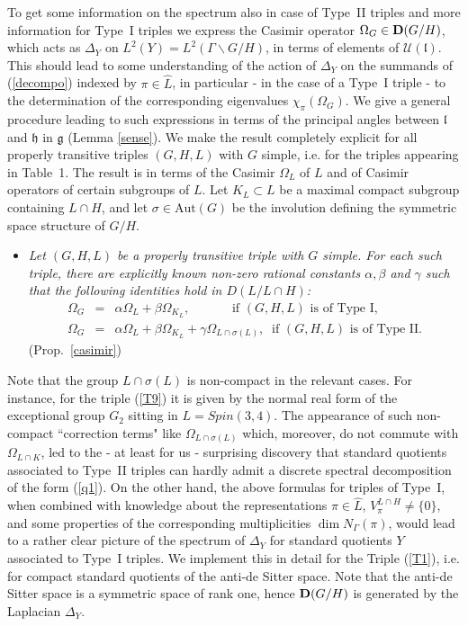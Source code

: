 \documentclass[10]{amsart}
\theoremstyle{remark}
\theoremstyle{definition}
\numberwithin{equation}{section}
\newcommand{\Aut}{{\mathrm{Aut}}}
\newcommand{\fg}{{\mathfrak g}}
\newcommand{\fh}{{\mathfrak h}}
\newcommand{\fl}{{\mathfrak l}}
\newcommand{\Cal}{\mathcal}
\begin{document}
To get some information on the spectrum also in case of Type~II triples and more information for Type~I triples
we express the Casimir operator $\Omega_G\in {\bf D}(G/H)$, which acts as $\Delta_Y$ on $L^2(Y)=L^2(\Gamma\backslash G/H)$, in terms of elements of ${\Cal U}(\fl)$.
This should lead to some understanding of the action of  $\Delta_Y$ on the summands of (\ref{decompo}) indexed by $\pi\in\widehat L$,
in particular - in the case of a Type~I triple - to the determination of the corresponding eigenvalues $\chi_\pi(\Omega_G)$. We give a general procedure leading to such expressions
in terms of the principal angles between $\fl$ and $\fh$ in $\fg$ (Lemma \ref{sense}). We make the result completely explicit for all properly transitive triples
$(G,H,L)$ with $G$ simple, i.e. for the triples appearing in Table~1. The result is in terms of the Casimir $\Omega_L$ of $L$ and of Casimir operators of certain subgroups of $L$. Let $K_L\subset L$ be a maximal compact subgroup containing $L\cap H$, and let $\sigma\in\Aut(G)$ be the involution defining the symmetric space structure of $G/H$.
\begin{itemize}
\item[({\bf E})] {\em Let $(G,H,L)$ be a properly transitive triple with $G$ simple. For each such triple, there are explicitly known non-zero rational constants $\alpha,\beta$ and 
$\gamma$ such
that the following identities hold in $D(L/L\cap H)$:  
\begin{eqnarray*} \Omega_G &= &\alpha\Omega_L+\beta\Omega_{K_L},\quad\quad\quad\mbox{ if }(G,H,L)\mbox{ is of Type~I},\\
\Omega_G& =& \alpha\Omega_L+\beta\Omega_{K_L} +\gamma\Omega_{L\cap\sigma(L)},\  \mbox{ if }(G,H,L)\mbox{ is of Type~II}.
\end{eqnarray*}}
(Prop.~\ref{casimir})
\end{itemize}
Note that the group $L\cap\sigma(L)$ is non-compact in the relevant cases. For instance, for the triple (\ref{T9}) it is given by the normal real form of the exceptional group
$G_2$ sitting in $L=Spin(3,4)$. The appearance of such non-compact ``correction terms" like $\Omega_{L\cap\sigma(L)}$  which, moreover, do not commute with $\Omega_{L\cap K}$,
led to the - at least for us -  surprising  discovery that standard quotients associated to Type~II triples can hardly admit a discrete spectral decomposition of the form (\ref{q1}).
On the other hand, the above formulas for triples of Type~I, when combined with knowledge about the representations $\pi\in\widehat L$, $V_\pi^{L\cap H}\ne\{0\}$,  and some properties of the corresponding multiplicities $\dim N_\Gamma(\pi)$, would lead to a rather clear picture of the spectrum of $\Delta_Y$ for standard quotients $Y$ associated to Type~I triples.
We implement this in detail for the Triple (\ref{T1}), i.e. for compact standard quotients of the anti-de Sitter space. Note that the anti-de Sitter space is a symmetric space of rank one,
hence  ${\bf D}(G/H)$ is generated by the Laplacian $\Delta_Y$.
\end{document}
